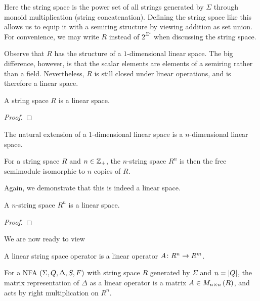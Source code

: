 \documentclass[12pt]{article}
\begin{document}
Here the string space is the power set of all strings generated
by \(\Sigma\) through monoid multiplication (string concatenation).
Defining the string space like this allows us to equip it with a semiring
structure by viewing addition as set union.
For convenience, we may write \(R\) instead of \(2^{\Sigma^\star}\)
when discussing the string space.

Observe that \(R\) has the structure of a \(1\)-dimensional linear space.
The big difference, however, is that the scalar elements are
elements of a semiring rather than a field.
Nevertheless, \(R\) is still closed under linear operations,
and is therefore a linear space.

\begin{theorem}
  A string space \(R\) is a linear space.
\end{theorem}
\begin{proof}
\end{proof}

The natural extension of a \(1\)-dimensional linear space
is a \(n\)-dimensional linear space.


\begin{definition}
  For a string space \(R\) and \(n \in \mathbb{Z}_{+}\),
  the \(n\)-string space \(R^n\) is then the
  free semimodule isomorphic to \(n\) copies of \(R\).
\end{definition}

Again, we demonstrate that this is indeed a linear space.

\begin{theorem}
  A \(n\)-string space \(R^n\) is a linear space.
\end{theorem}
\begin{proof}
\end{proof}

We are now ready to view


\begin{definition}
  A linear string space operator
  is a linear operator \(A \colon R^n \to R^m\).
\end{definition}

\begin{definition}
  For a NFA \(\left(\Sigma, Q, \Delta, S, F\right)\) with
  string space \(R\) generated by \(\Sigma\) and \(n = \left\lvert Q\right\rvert\),
  the matrix representation of \(\Delta\) as a linear operator
  is a matrix
  \(A \in M_{n \times n} \left(R\right)\),
  and acts by right multiplication on \(R^n\).
\end{definition}
\end{document}
